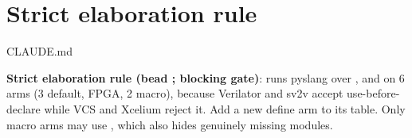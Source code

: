 \chapter{Strict elaboration rule}\label{ds:inv:strict-elaboration}
\begin{relocated}{CLAUDE.md}

\textbf{Strict elaboration rule (bead ; blocking
 gate)}:  runs
pyslang over ,  and  on
6 arms (3 default, FPGA, 2 macro), because Verilator and sv2v accept
use-before-declare while VCS and Xcelium reject it. Add a new define arm
to its  table. Only macro arms may use
, which also hides genuinely missing
modules.
\end{relocated}
